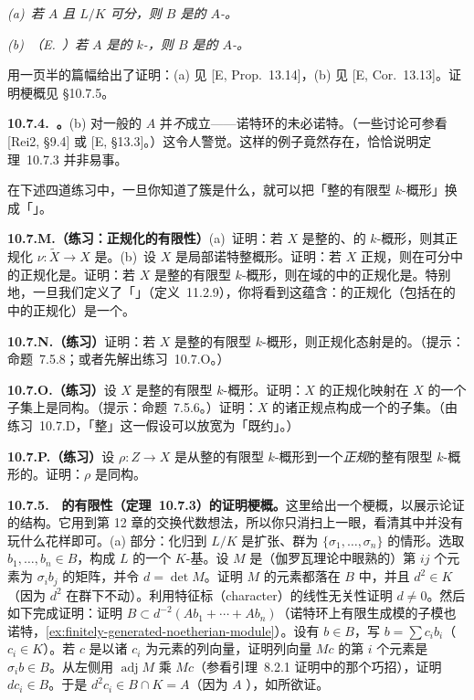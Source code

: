 \emph{(a)~若 $A$ \trIntegrallyClosed{}且 $L/K$ 可分，则 $B$ 是\trFinitelyGenerated{}的 $A$-\trModule。}

\emph{(b)~（E.~\trNoether）若 $A$ 是\trFinitelyGenerated{}的 $k$-\trAlgebra，则 $B$ 是\trFinitelyGenerated{}的 $A$-\trModule。}

\trEisenbud{}用一页半的篇幅给出了证明：(a) 见 [E, Prop.~13.14]，(b) 见 [E, Cor.~13.13]。证明梗概见 \S10.7.5。

\textbf{10.7.4.\ \trhWarning{}。}\quad (b) 对一般的\trNoetherian{} $A$ 并\emph{不}成立——诺特环的\trIntegralClosure{}未必诺特。（一些讨论可参看 [Rei2, \S9.4] 或 [E, \S13.3]。）这令人警觉。这样的例子竟然存在，恰恰说明定理~10.7.3 并非易事。

在下述四道练习中，一旦你知道了簇是什么，就可以把「整的有限型 $k$-概形」换成「\trIntegral{}\trVariety」。

\textbf{10.7.M.（练习：正规化的有限性）}\quad (a)~证明：若 $X$ 是整的、\trLocally\trFiniteType{}的 $k$-概形，则其正规化 $\nu\colon\widetilde{X}\to X$ 是\trFinite{}\trMorphism。(b)~设 $X$ 是局部诺特整概形。证明：若 $X$ 正规，则在\trFinite{}可分\trFieldExtension{}中的正规化是\trFinite{}\trMorphism。证明：若 $X$ 是整的有限型 $k$-概形，则在域的\trFinite{}\trExtension{}中的正规化是\trFinite{}\trMorphism。特别地，一旦我们定义了「\trVariety」（定义~11.2.9），你将看到这蕴含：\trVariety{}的正规化（包括在\trFunctionField{}的\trFinite{}\trExtension{}中的正规化）是一个\trVariety。

\textbf{10.7.N.（练习）}\quad 证明：若 $X$ 是整的有限型 $k$-概形，则正规化态射是\trBirational{}的。（提示：命题~7.5.8；或者先解出\mbox{练习~10.7.O}。）

\textbf{10.7.O.（练习）}\quad 设 $X$ 是整的有限型 $k$-概形。证明：$X$ 的正规化映射在 $X$ 的一个\trOpen\trDense{}子集上是同构。（提示：命题~7.5.6。）证明：$X$ 的诸正规点构成一个\trDense{}的\trOpen{}子集。（由\mbox{练习~10.7.D}，「整」这一假设可以放宽为「既约」。）

\textbf{10.7.P.（练习）}\quad 设 $\rho\colon Z\to X$ 是从整的有限型 $k$-概形到一个\emph{正规}的整有限型 $k$-概形的\trFinite{}\trBirational{}\trMorphism。证明：$\rho$ 是同构。

\textbf{10.7.5.}\ \extrahard\ \textbf{\trIntegralClosure{}的有限性（定理~10.7.3）的证明梗概。}\quad 这里给出一个梗概，以展示论证的结构。它用到第 12 章的交换代数想法，所以你只消扫上一眼，看清其中并没有玩什么花样即可。(a) 部分：化归到 $L/K$ 是\trGalois{}扩张、群为 $\{\sigma_1,\dots,\sigma_n\}$ 的情形。选取 $b_1,\dots,b_n\in B$，构成 $L$ 的一个 $K$-\trVectorSpace{}基。设 $M$ 是（伽罗瓦理论中眼熟的）第 $ij$ 个元素为 $\sigma_i b_j$ 的矩阵，并令 $d=\det M$。证明 $M$ 的元素都落在 $B$ 中，并且 $d^2\in K$（因为 $d^2$ 在\trGalois{}群下不动）。利用特征标（character）的线性无关性证明 $d\neq 0$。然后如下完成证明：证明 $B\subset d^{-2}(Ab_1+\cdots+Ab_n)$（诺特环上有限生成模的子模也诺特，\cref{ex:finitely-generated-noetherian-module}）。设有 $b\in B$，写 $b=\sum c_i b_i$（$c_i\in K$）。若 $c$ 是以诸 $c_i$ 为元素的列向量，证明列向量 $Mc$ 的第 $i$ 个元素是 $\sigma_i b\in B$。从左侧用 $\operatorname{adj}M$ 乘 $Mc$（参看引理~8.2.1 证明中的那个巧招），证明 $dc_i\in B$。于是 $d^2c_i\in B\cap K=A$（因为 $A$ \trIntegrallyClosed），如所欲证。

